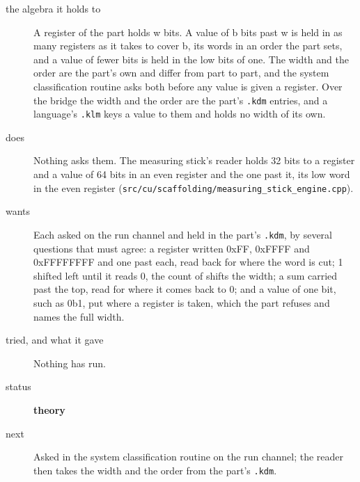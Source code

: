 \begin{description}
\item[{the algebra it holds to}] A register of the part holds w bits. A value of b bits past w is held in as many registers as it takes to cover b, its words in an order the part sets, and a value of fewer bits is held in the low bits of one. The width and the order are the part's own and differ from part to part, and the system classification routine asks both before any value is given a register. Over the bridge the width and the order are the part's \texttt{.\allowbreak{}kdm} entries, and a language's \texttt{.\allowbreak{}klm} keys a value to them and holds no width of its own.
\item[{does}] Nothing asks them. The measuring stick's reader holds 32 bits to a register and a value of 64 bits in an even register and the one past it, its low word in the even register (\texttt{src/\allowbreak{}cu/\allowbreak{}scaffolding/\allowbreak{}measuring\_\allowbreak{}stick\_\allowbreak{}engine.\allowbreak{}cpp}).
\item[{wants}] Each asked on the run channel and held in the part's \texttt{.\allowbreak{}kdm}, by several questions that must agree: a register written 0xFF, 0xFFFF and 0xFFFFFFFF and one past each, read back for where the word is cut; 1 shifted left until it reads 0, the count of shifts the width; a sum carried past the top, read for where it comes back to 0; and a value of one bit, such as 0b1, put where a register is taken, which the part refuses and names the full width.
\item[{tried, and what it gave}] Nothing has run.
\item[{status}] \textbf{theory}
\item[{next}] Asked in the system classification routine on the run channel; the reader then takes the width and the order from the part's \texttt{.\allowbreak{}kdm}.
\end{description}

